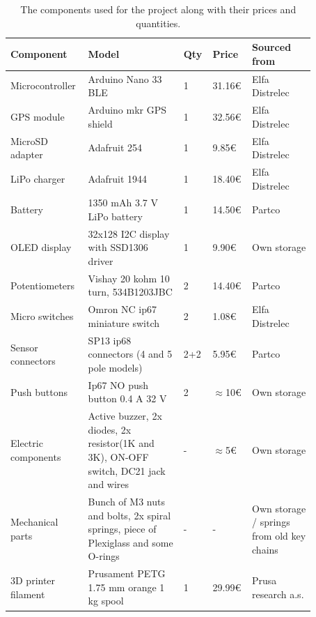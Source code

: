 \documentclass[a4paper,11pt]{article}
\begin{document}
\begin{table}[H]
    \caption{The components used for the project along with their prices and quantities.}
    \centering
    \begin{tabular}{ |p{0.2\linewidth} | p{0.3\linewidth}| p{0.07\linewidth}| p{0.1\linewidth}| p{0.2\linewidth}| } 
     \hline
     Component & Model & Qty & Price & Sourced from \\ 
     \hline
     \hline
     Microcontroller &	Arduino Nano 33 BLE &	1 &	31.16€ &	Elfa Distrelec\\
     \hline
     GPS module &	Arduino mkr GPS shield &	1 &	32.56€ &	Elfa Distrelec\\
     \hline
     MicroSD adapter &	Adafruit 254 &	1 &	9.85€ &	Elfa Distrelec\\
     \hline
     LiPo charger &	Adafruit 1944 &	1 &	18.40€ &	Elfa Distrelec\\
     \hline
     Battery &	1350 mAh 3.7 V LiPo battery &	1 &	14.50€ &	Partco\\
     \hline
     OLED display &	32x128 I2C display with SSD1306 driver &	1 &	9.90€ &	Own storage\\
     \hline
     Potentiometers &	Vishay 20 kohm 10 turn, 534B1203JBC &	2 &	14.40€ &	Partco\\
     \hline
     Micro switches &	Omron NC ip67 miniature switch &	2 &	1.08€ &	Elfa Distrelec\\
     \hline
     Sensor connectors &	SP13 ip68 connectors (4 and 5 pole models) &	2+2	& 5.95€ &	Partco\\
     \hline
     Push buttons &	Ip67 NO push button 0.4 A 32 V &	2 &	$\approx$10€ &	Own storage\\
     \hline
     Electric components & Active buzzer, 2x diodes, 2x resistor(1K and 3K), ON-OFF switch, DC21 jack and wires & - & $\approx$5€ &	Own storage\\
     \hline
     Mechanical parts & Bunch of M3 nuts and bolts, 2x spiral springs, piece of Plexiglass and some O-rings & - & - & Own storage / springs from old key chains\\
     \hline
     3D printer filament &	Prusament PETG 1.75 mm orange 1 kg spool &	1 &	29.99€ &	Prusa research a.s.\\
     \hline
    \end{tabular}
    \label{tab:components}
\end{table}
\end{document}
